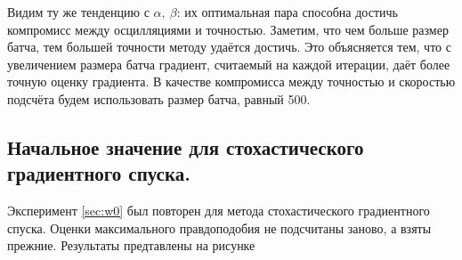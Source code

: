 \documentclass[12pt]{extarticle}
\begin{document}
\begin{figure}[!htb]
\begin{subfigure}[t]{0.48\linewidth}
        \label{fig:loss_step_batch}
     \end{subfigure}
     \label{fig:step_batch_rough}
\end{figure}

Видим ту же тенденцию с $\alpha,\ \beta$: их оптимальная пара способна достичь компромисс между осцилляциями и точностью. Заметим, что чем больше размер батча, тем большей точности методу удаётся достичь. Это объясняется тем, что с увеличением размера батча градиент, считаемый на каждой итерации, даёт более точную оценку градиента. В качестве компромисса между точностью и скоростью подсчёта будем использовать размер батча, равный 500.

\subsection{Начальное значение для стохастического градиентного спуска.}

Эксперимент \ref{sec:w0} был повторен для метода стохастического градиентного спуска. Оценки максимального правдоподобия не подсчитаны заново, а взяты прежние. Результаты предтавлены на рисунке
\end{document}

